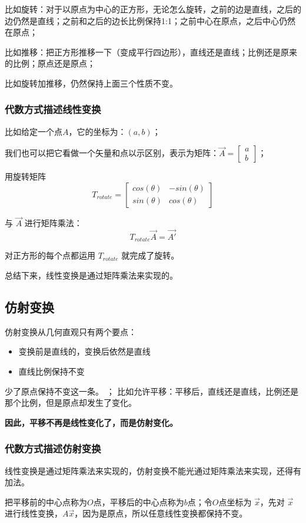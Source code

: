 \documentclass[12pt]{article}
\begin{document}
比如旋转：对于以原点为中心的正方形，无论怎么旋转，之前的边是直线，之后的边仍然是直线；之前和之后的边长比例保持1:1；之前中心在原点，之后中心仍然在原点；

比如推移：把正方形推移一下（变成平行四边形），直线还是直线；比例还是原来的比例；原点还是原点；

比如旋转加推移，仍然保持上面三个性质不变。

\subsubsection{代数方式描述线性变换}
比如给定一个点$A$，它的坐标为：$(a,b)$；

我们也可以把它看做一个矢量和点以示区别，表示为矩阵：$\vec{A} = \begin{bmatrix}a \\ b\end{bmatrix}$；

用旋转矩阵
$$
T_{rotate}=\begin{bmatrix}cos(\theta)&-sin(\theta)\\sin(\theta)&cos(\theta)\end{bmatrix}
$$

与 $\vec{A}$ 进行矩阵乘法：
$$
T_{rotate}\vec{A} = \vec{A'}
$$

对正方形的每个点都运用 $T_{rotate}$ 就完成了旋转。

总结下来，线性变换是通过矩阵乘法来实现的。

\subsection{仿射变换}
仿射变换从几何直观只有两个要点：
\begin{itemize}
    \item 变换前是直线的，变换后依然是直线
    \item 直线比例保持不变
\end{itemize}

少了原点保持不变这一条。
；
比如允许平移：平移后，直线还是直线，比例还是那个比例，但是原点却发生了变化。

\textbf{因此，平移不再是线性变化了，而是仿射变化。}

\subsubsection{代数方式描述仿射变换}
线性变换是通过矩阵乘法来实现的，仿射变换不能光通过矩阵乘法来实现，还得有加法。

把平移前的中心点称为$O$点，平移后的中心点称为$b$点；令$O$点坐标为 $\vec{x}$，先对 $\vec{x}$ 进行线性变换，$A\vec{x}$，因为是原点，所以任意线性变换都保持不变。
\end{document}
